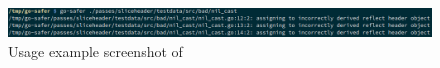 \begin{figure}[htp!]
    \centering
    \includegraphics[width=\textwidth]{assets/images/chapter5/go-safer-screenshot.png}
    \caption{Usage example screenshot of \toolSafer{}}
    \label{fig:go-safer-screenshot}
\end{figure}
